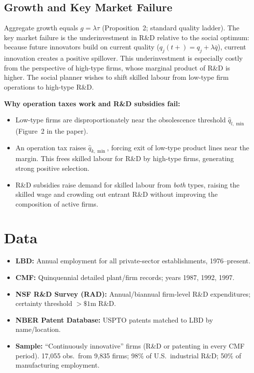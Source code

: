 \subsection*{Growth and Key Market Failure}

Aggregate growth equals $g = \lambda\tau$ (Proposition~2; standard quality
ladder). The key market failure is the underinvestment in R\&D relative to the
social optimum: because future innovators build on current quality
($q_j(t+) = q_j + \lambda\bar{q}$), current innovation creates a positive
spillover. This underinvestment is especially costly from the perspective of
high-type firms, whose marginal product of R\&D is higher. The social planner
wishes to shift skilled labour from low-type firm operations to high-type R\&D.

\textbf{Why operation taxes work and R\&D subsidies fail:}
\begin{itemize}
  \item Low-type firms are disproportionately near the obsolescence threshold
    $\hat{q}_{l,\min}$ (Figure~2 in the paper).
  \item An operation tax raises $\hat{q}_{k,\min}$, forcing exit of low-type
    product lines near the margin. This frees skilled labour for R\&D by
    high-type firms, generating strong positive selection.
  \item R\&D subsidies raise demand for skilled labour from \emph{both} types,
    raising the skilled wage and crowding out entrant R\&D without improving
    the composition of active firms.
\end{itemize}

\section{Data}

\begin{itemize}
  \item \textbf{LBD:} Annual employment for all private-sector
    establishments, 1976--present.
  \item \textbf{CMF:} Quinquennial detailed plant/firm records; years
    1987, 1992, 1997.
  \item \textbf{NSF R\&D Survey (RAD):} Annual/biannual firm-level R\&D
    expenditures; certainty threshold $>\$1$m R\&D.
  \item \textbf{NBER Patent Database:} USPTO patents matched to LBD by
    name/location.
  \item \textbf{Sample:} ``Continuously innovative'' firms (R\&D or
    patenting in every CMF period). 17,055 obs.\ from 9,835 firms; 98\%
    of U.S.\ industrial R\&D; 50\% of manufacturing employment.
\end{itemize}

